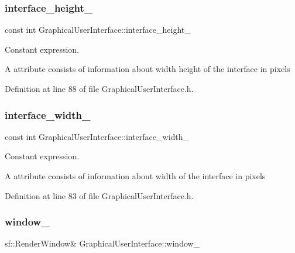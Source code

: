 \subsubsection{\texorpdfstring{interface\+\_\+height\+\_\+}{interface\_height\_}}
{\footnotesize\ttfamily const int Graphical\+User\+Interface\+::interface\+\_\+height\+\_\+\hspace{0.3cm}{\ttfamily [private]}}



Constant expression. 

A attribute consists of information about width height of the interface in pixels 

Definition at line 88 of file Graphical\+User\+Interface.\+h.

\mbox{\label{classGraphicalUserInterface_ae3c07ea59e557909f92882028fafb0a3}} 
\subsubsection{\texorpdfstring{interface\+\_\+width\+\_\+}{interface\_width\_}}
{\footnotesize\ttfamily const int Graphical\+User\+Interface\+::interface\+\_\+width\+\_\+\hspace{0.3cm}{\ttfamily [private]}}



Constant expression. 

A attribute consists of information about width of the interface in pixels 

Definition at line 83 of file Graphical\+User\+Interface.\+h.

\mbox{\label{classGraphicalUserInterface_ae51adeb759a97196eda3b37bfc80a452}} 
\subsubsection{\texorpdfstring{window\+\_\+}{window\_}}
{\footnotesize\ttfamily sf\+::\+Render\+Window\& Graphical\+User\+Interface\+::window\+\_\+\hspace{0.3cm}{\ttfamily [private]}}



